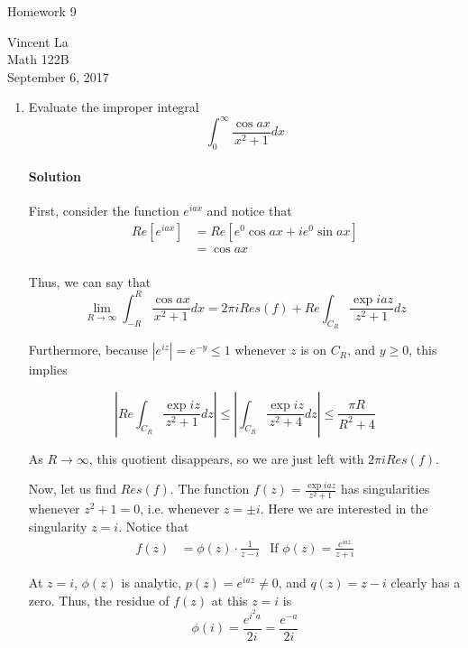 \documentclass[11pt]{article}
\title{ }
\begin{document}
	\begin{center}	%
		\Large{Homework 9}	%
	\end{center}
	\begin{center}
		Vincent La \\
		Math 122B \\
		September 6, 2017
	\end{center}
	
\begin{enumerate}
	\item Evaluate the improper integral
	\[ \int^{\infty}_0 \frac{\cos{ax}}{x^2 + 1} dx \]
	
	\paragraph{Solution} First, consider the function 
	$e^{iax}$ and notice that
	\[\begin{aligned}
	Re[e^{iax}]
	&= Re[e^0 \cos{ax} + ie^0 \sin{ax}] \\
	&= \cos{ax} \\
	\end{aligned}\]
	
	Thus, we can say that
	\[
	\lim_{R \rightarrow \infty} \int^R_{-R} \frac{\cos{ax}}{x^2 + 1} dx = 2\pi i Res(f) + Re \int_{C_R} \frac{\exp{iaz}}{z^2 + 1} dz 
	\]
	
	Furthermore, because $|e^{iz}| = e^{-y} \leq 1$	
	whenever $z$ is on $C_R$, and $y \geq 0$, this implies
	
	\[|Re \int_{C_R} \frac{\exp{iz}}{z^2 + 1} dz| \leq
	  |\int_{C_R} \frac{\exp{iz}}{z^2 + 4} dz| \leq 
	  \frac{\pi R}{R^2 + 4}\]
	  
	As $R \rightarrow \infty$, this quotient disappears, so we are just left with $2\pi i Res(f)$. 
	
	\bigskip
	
	Now, let us find $Res(f)$. The function $f(z) = \frac{\exp{iaz}}{z^2 + 1}$ has singularities whenever $z^2 + 1 = 0$, i.e. whenever $z = \pm i$. Here we are interested in the singularity $z = i$. Notice that
	\[\begin{aligned} f(z) &= \phi(z) \cdot \frac{1}{z - i}
	& \text{If $\phi(z) = \frac{e^{iaz}}{z + i}$} \end{aligned}\]
	
	At $z = i$, $\phi(z)$ is analytic, $p(z) = e^{iaz} \neq 0$, and $q(z) = z - i$ clearly has a zero. Thus, the residue of $f(z)$ at this $z = i$ is 
	\[\phi(i) = \frac{e^{i^2a}}{2i} = \frac{e^{-a}}{2i}\]
	

\end{enumerate}
\end{document}
